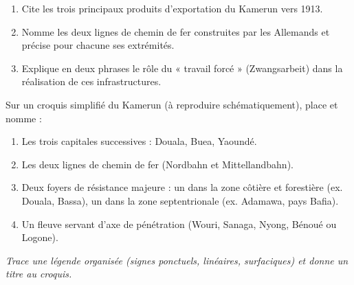 \documentclass[11pt]{article}
\begin{document}
\begin{exercice}
\begin{enumerate}
    \item Cite les trois principaux produits d'exportation du Kamerun vers 1913.
    \item Nomme les deux lignes de chemin de fer construites par les Allemands et précise pour chacune ses extrémités.
    \item Explique en deux phrases le rôle du « travail forcé » (Zwangsarbeit) dans la réalisation de ces infrastructures.
\end{enumerate}
\end{exercice}

\begin{exercice}
Sur un croquis simplifié du Kamerun (à reproduire schématiquement), place et nomme :
\begin{enumerate}
    \item Les trois capitales successives : Douala, Buea, Yaoundé.
    \item Les deux lignes de chemin de fer (Nordbahn et Mittellandbahn).
    \item Deux foyers de résistance majeure : un dans la zone côtière et forestière (ex. Douala, Bassa), un dans la zone septentrionale (ex. Adamawa, pays Bafia).
    \item Un fleuve servant d'axe de pénétration (Wouri, Sanaga, Nyong, Bénoué ou Logone).
\end{enumerate}
\textit{Trace une légende organisée (signes ponctuels, linéaires, surfaciques) et donne un titre au croquis.}
\end{exercice}
\end{document}
